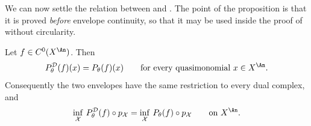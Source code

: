 We can now settle the relation between  and
.  The point of the proposition is that it is
proved \emph{before} envelope continuity, so that it may be used inside the
proof of  without circularity.

\begin{proposition}\label{prop:ch23-model-vs-psh-envelope}
Let \(f\in C^0(X^{\An})\).  Then
\begin{equation}\label{eq:ch23-two-envelopes-quasimonomial}
 P^{\mathcal D}_\theta(f)(x)=P_\theta(f)(x)
 \qquad\text{for every quasimonomial }x\in X^{\An}.
\end{equation}
Consequently the two envelopes have the same restriction to every dual
complex, and
\begin{equation}\label{eq:ch23-two-envelopes-inf}
 \inf_{\mathcal X}\,P^{\mathcal D}_\theta(f)\circ p_{\mathcal X}
 =\inf_{\mathcal X}\,P_\theta(f)\circ p_{\mathcal X}
 \qquad\text{on }X^{\An}.
\end{equation}
\end{proposition}

